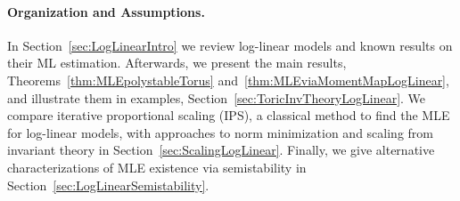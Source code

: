 \paragraph{Organization and Assumptions.}
In Section~\ref{sec:LogLinearIntro} we review log-linear models and known results on their ML estimation. Afterwards, we present  the main results, Theorems~\ref{thm:MLEpolystableTorus} and~\ref{thm:MLEviaMomentMapLogLinear}, and illustrate them in examples, Section~\ref{sec:ToricInvTheoryLogLinear}. We compare iterative proportional scaling (IPS), a classical method to find the MLE for log-linear models, with approaches to norm minimization and scaling from invariant theory in Section~\ref{sec:ScalingLogLinear}. Finally, we give alternative characterizations of MLE existence via semistability in Section~\ref{sec:LogLinearSemistability}. %




